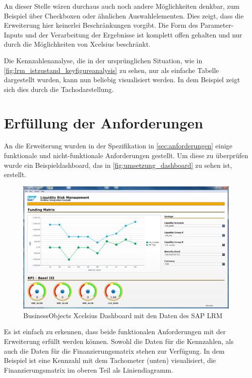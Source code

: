 \begin{onehalfspacing}
An dieser Stelle wären durchaus auch noch andere Möglichkeiten denkbar, zum Beispiel über Checkboxen oder ähnlichen Auswahlelementen. Dies zeigt, dass die Erweiterung hier keinerlei Beschränkungen vorgibt. Die Form des Parameter-Inputs und der Verarbeitung der Ergebnisse ist komplett offen gehalten und nur durch die Möglichkeiten von Xcelsius beschränkt.

Die Kennzahlenanalyse, die in der ursprünglichen Situation, wie in \vref{fig:lrm_istzustand_keyfigureanalysis} zu sehen, nur als einfache Tabelle dargestellt wurden, kann nun beliebig visualisiert werden. In dem Beispiel zeigt sich dies durch die Tachodarstellung.


\section{Erfüllung der Anforderungen}
An die Erweiterung wurden in der Spezifikation in \vref{sec:anforderungen} einige funktionale und nicht-funktionale Anforderungen gestellt. Um diese zu überprüfen wurde ein Beispieldashboard, das in \vref{fig:umsetzung_dashboard} zu sehen ist, erstellt.

\begin{figure}[!ht]
\centering
\setlength{\unitlength}{1mm}
\includegraphics[width=15cm]{images/dashboard_preview.PNG}
\caption{BusinessObjects Xcelsius Dashboard mit den Daten des SAP LRM\label{fig:umsetzung_dashboard}}
\end{figure}  

Es ist einfach zu erkennen, dass beide funktionalen Anforderungen mit der Erweiterung erfüllt werden können. Sowohl die Daten für die Kennzahlen, als auch die Daten für die Finanzierungsmatrix stehen zur Verfügung. In dem Beispiel ist eine Kennzahl mit dem Tachometer (unten) visualisiert, die Finanzierungsmatrix im oberen Teil als Liniendiagramm.


\end{onehalfspacing}

